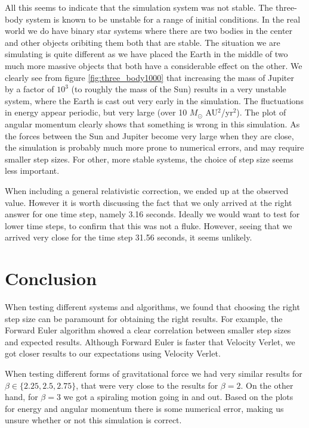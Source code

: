 \documentclass[reprint, english,notitlepage,nofootinbib]{revtex4-1}  %
\begin{document}
All this seems to indicate that the simulation system was not stable. The three-body system is known to be unstable for a range of initial conditions. In the real world we do have binary star systems where there are two bodies in the center and other objects oribiting them both that are stable. The situation we are simulating is quite different as we have placed the Earth in the middle of two much more massive objects that both have a considerable effect on the other. We clearly see from figure \ref{fig:three_body1000} that increasing the mass of Jupiter by a factor of $10^3$ (to roughly the mass of the Sun) results in a very unstable system, where the Earth is cast out very early in the simulation. The fluctuations in energy appear periodic, but very large (over 10 $M_\odot$ AU$^2$/yr$^2$). The plot of angular momentum clearly shows that something is wrong in this simulation. As the forces between the Sun and Jupiter become very large when they are close, the simulation is probably much more prone to numerical errors, and may require smaller step sizes. For other, more stable systems, the choice of step size seems less important.

When including a general relativistic correction, we ended up at the observed value. However it is worth discussing the fact that we only arrived at the right answer for one time step, namely 3.16 seconds. Ideally we would want to test for lower time steps, to confirm that this was not a fluke. However, seeing that we arrived very close for the time step 31.56 seconds, it seems unlikely.

\section{Conclusion}

When testing different systems and algorithms, we found that choosing the right step size can be paramount for obtaining the right results. For example, the Forward Euler algorithm showed a clear correlation between smaller step sizes and expected results. Although Forward Euler is faster that Velocity Verlet, we got closer results to our expectations using Velocity Verlet.

When testing different forms of gravitational force we had very similar results for $\beta \in \{2.25,2.5,2.75\}$, that were very close to the results for $\beta = 2$. On the other hand, for $\beta = 3$ we got a spiraling motion going in and out. Based on the plots for energy and angular momentum there is some numerical error, making us unsure whether or not this simulation is correct.
\end{document}

